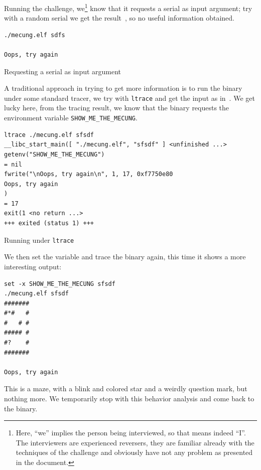 \documentclass{easychair}
\begin{document}
Running the challenge, we\footnote{Here, ``we'' implies the person being interviewed, so that means indeed ``I''. The interviewers are experienced reversers, they are familiar already with the techniques of the challenge and obviously have not any problem as presented in the document.} know that it requests a serial as input argument; try with a random serial we get the result~, so no useful information obtained.
\begin{listing}[h]
  \begin{verbatim}
./mecung.elf sdfs

Oops, try again
  \end{verbatim}
  \caption{Requesting a serial as input argument}
  \label{fig:serial_request}
\end{listing}
A traditional approach in trying to get more information is to run the binary under some standard tracer, we try with \texttt{ltrace} and get the input as in~. We get lucky here, from the tracing result, we know that the binary requests the environment variable \texttt{SHOW\_ME\_THE\_MECUNG}.
\begin{listing}[h]
  \begin{verbatim}
ltrace ./mecung.elf sfsdf
__libc_start_main([ "./mecung.elf", "sfsdf" ] <unfinished ...>
getenv("SHOW_ME_THE_MECUNG")                                                                                           = nil
fwrite("\nOops, try again\n", 1, 17, 0xf7750e80
Oops, try again
)                                                                       = 17
exit(1 <no return ...>
+++ exited (status 1) +++
  \end{verbatim}
  \caption{Running under \texttt{ltrace}}
  \label{fig:running_ltrace}
\end{listing}
We then set the variable and trace the binary again, this time it shows a more interesting output:
\begin{listing}[h]
  \begin{verbatim}
set -x SHOW_ME_THE_MECUNG sfsdf
./mecung.elf sfsdf
#######
#*#   #
#   # #
##### #
#?    #
#######

Oops, try again
  \end{verbatim}
\end{listing}

This is a maze, with a blink and colored star and a weirdly question mark, but nothing more. We temporarily stop with this behavior analysis and come back to the binary.
\end{document}
